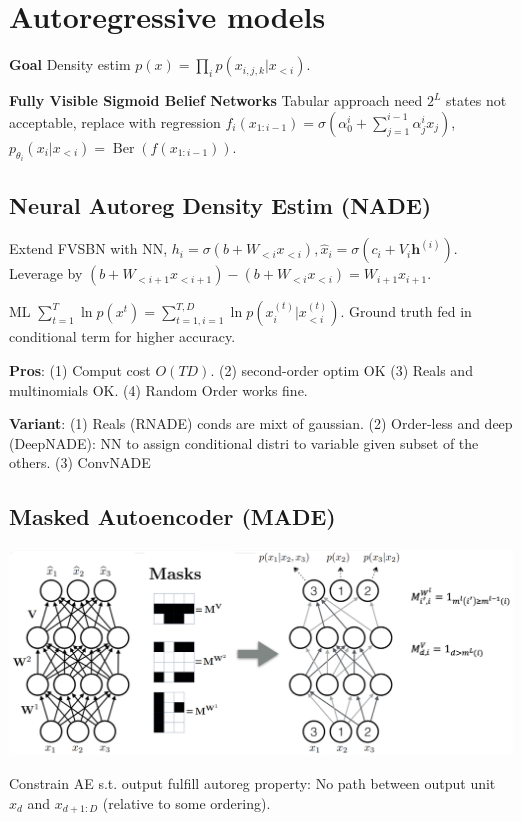 \section{Autoregressive models}
\textbf{Goal} Density estim \(p({x}) = \prod_{i} p({x}_{i, j, k} | {x}_{<i})\).

\textbf{Fully Visible Sigmoid Belief Networks} Tabular approach need \(2^{L}\) states not acceptable, replace with regression \(f_{i}(x_{1:i-1})= \sigma(\alpha_{0}^{i}+\sum_{j=1}^{i-1}\alpha_{j}^{i} x_{j})\),\\ \(p_{\theta_{i}}(x_{i} | x_{<i})=\operatorname{Ber}(f(x_{1:i-1}))\).


\subsection*{Neural Autoreg Density Estim (NADE)}
Extend FVSBN with NN, \({h}_{i}=\sigma({b}+{W}_{<i} {x}_{<i}), \hat{x}_{i}=\sigma(c_{i}+V_{i} \mathbf{h}^{({i})})\).
Leverage by \(({b}+{W}_{<i+1} {x}_{<i+1})-({b}+{W}_{<i}{x}_{<i})={W}_{i+1 }{x}_{i+1}\).

ML \(\sum_{t=1}^{T} \ln p(x^{t}) = \sum_{t=1, i=1}^{T, D}  \ln p(x_{i}^{(t)} | x_{<i}^{(t)})\). Ground truth fed in conditional term for higher accuracy.

\textbf{Pros}: (1) Comput cost \(O(TD)\). (2) second-order optim OK (3) Reals and multinomials OK. (4) Random Order works fine.

\textbf{Variant}:
(1) Reals (RNADE) conds are mixt of gaussian.
(2) Order-less and deep (DeepNADE): NN to assign conditional distri to variable given subset of the others.
(3) ConvNADE

\subsection*{Masked Autoencoder (MADE)}
\begin{center}
    \includegraphics[width=\columnwidth]{figures/MADE.png}
\end{center}
Constrain AE s.t. output fulfill autoreg property: No path between output unit \(x_d\) and  \(x_{d+1:D}\) (relative to some ordering).

